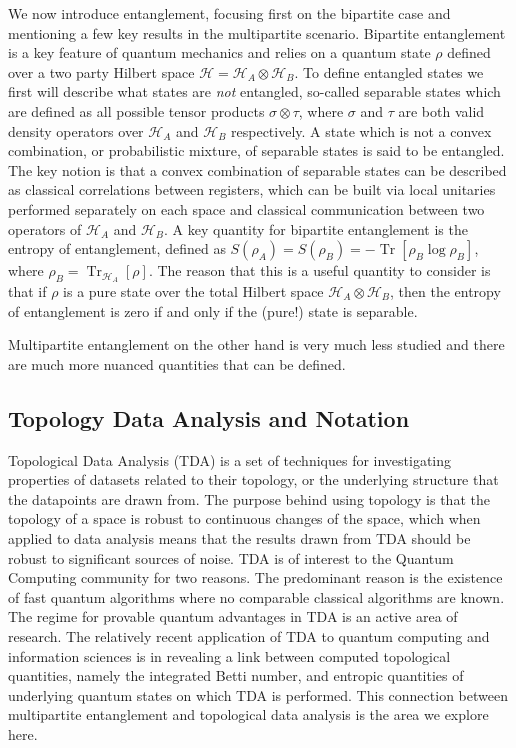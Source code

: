\documentclass{article}
\DeclareMathOperator{\Tr}{Tr}
\newcommand{\brackets}[1]{\left[ #1 \right]}
\newcommand{\trace}[1]{\Tr \brackets{ #1 }}
\newcommand{\partrace}[2]{\Tr_{#1} \brackets{ #2 }}
\newcommand{\hilb}{\mathcal{H}}
\begin{document}
We now introduce entanglement, focusing first on the bipartite case and mentioning a few key results in the multipartite scenario. Bipartite entanglement is a key feature of quantum mechanics and relies on a quantum state $\rho$ defined over a two party Hilbert space $\hilb = \hilb_A \otimes \hilb_B$. To define entangled states we first will describe what states are \emph{not} entangled, so-called separable states which are defined as all possible tensor products $\sigma\otimes \tau$, where $\sigma$ and $\tau$ are both valid density operators over $\hilb_A$ and $\hilb_B$ respectively. A state which is not a convex combination, or probabilistic mixture, of separable states is said to be entangled. The key notion is that a convex combination of separable states can be described as classical correlations between registers, which can be built via local unitaries performed separately on each space and classical communication between two operators of $\hilb_A$ and $\hilb_B$. A key quantity for bipartite entanglement is the entropy of entanglement, defined as $S(\rho_A) = S(\rho_B) = -\trace{\rho_B \log \rho_B}$, where $\rho_B = \partrace{\hilb_A}{\rho}$. The reason that this is a useful quantity to consider is that if $\rho$ is a pure state over the total Hilbert space $\hilb_A \otimes \hilb_B$, then the entropy of entanglement is zero if and only if the (pure!) state is separable. 

Multipartite entanglement on the other hand is very much less studied and there are much more nuanced quantities that can be defined. 

\subsection{Topology Data Analysis and Notation}

Topological Data Analysis (TDA) is a set of techniques for investigating properties of datasets related to their topology, or the underlying structure that the datapoints are drawn from. The purpose behind using topology is that the topology of a space is robust to continuous changes of the space, which when applied to data analysis means that the results drawn from TDA should be robust to significant sources of noise. TDA is of interest to the Quantum Computing community for two reasons. The predominant reason is the existence of fast quantum algorithms where no comparable classical algorithms are known. The regime for provable quantum advantages in TDA is an active area of research. The relatively recent application of TDA to quantum computing and information sciences is in revealing a link between computed topological quantities, namely the integrated Betti number, and entropic quantities of underlying quantum states on which TDA is performed. This connection between multipartite entanglement and topological data analysis is the area we explore here. 
\end{document}
